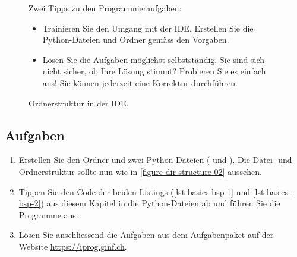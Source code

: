 \begin{figure}[htb]
\centering
\begin{minipage}{0.3\textwidth}
\centering
{}
\caption{Ordnerstruktur in der \ac{IDE}.}
\label{figure-dir-structure-02}
\end{minipage}
\hfill
\begin{minipage}{0.65\textwidth}
\centering
	\begin{important} Zwei Tipps zu den Programmieraufgaben:
	\begin{itemize}
	\item	Trainieren Sie den Umgang mit der \ac{IDE}. Erstellen Sie die Python-Dateien und Ordner gemäss den Vorgaben.
	\item Lösen Sie die Aufgaben möglichst selbstständig. Sie sind sich nicht sicher, ob Ihre Lösung stimmt? Probieren Sie es einfach aus! Sie können jederzeit eine Korrektur durchführen.
	\end{itemize}
	\end{important}
\end{minipage}
\end{figure}

\subsection{Aufgaben}

\begin{enumerate}
\item Erstellen Sie den Ordner  und zwei Python-Dateien ( und ). Die Datei- und Ordnerstruktur sollte nun wie in \autoref{figure-dir-structure-02} aussehen.
\item Tippen Sie den Code der beiden Listings (\autoref{lst-basics-bsp-1} und \autoref{lst-basics-bsp-2}) aus diesem Kapitel in die Python-Dateien ab und führen Sie die Programme aus.
\item Lösen Sie anschliessend die Aufgaben aus dem Aufgabenpaket  auf der Website \url{https://iprog.ginf.ch}.
\end{enumerate}

